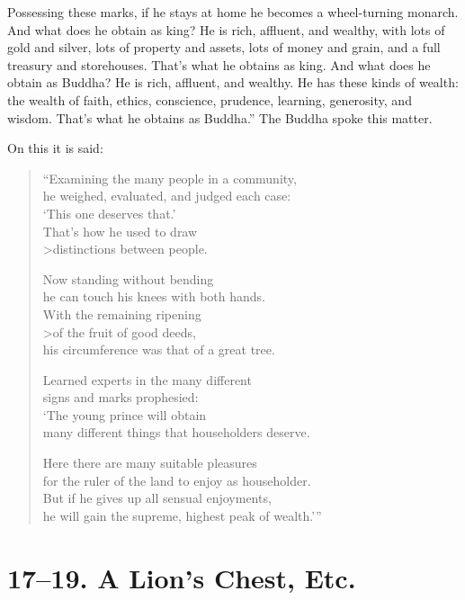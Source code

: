 \documentclass[12pt,openany]{book}%
\begin{document}
Possessing these marks, if he stays at home he becomes a wheel-turning monarch. And what does he obtain as king? He is rich, affluent, and wealthy, with lots of gold and silver, lots of property and assets, lots of money and grain, and a full treasury and storehouses. That’s what he obtains as king. And what does he obtain as Buddha? He is rich, affluent, and wealthy. He has these kinds of wealth: the wealth of faith, ethics, conscience, prudence, learning, generosity, and wisdom. That’s what he obtains as Buddha.” The Buddha spoke this matter. 

On this it is said: 

\begin{verse}%
“Examining the many people in a community, \\
he weighed, evaluated, and judged each case: \\
‘This one deserves that.’ \\
That’s how he used to draw \\>distinctions between people. 

Now standing without bending \\
he can touch his knees with both hands. \\
With the remaining ripening \\>of the fruit of good deeds, \\
his circumference was that of a great tree. 

Learned experts in the many different \\
signs and marks prophesied: \\
‘The young prince will obtain \\
many different things that householders deserve. 

Here there are many suitable pleasures \\
for the ruler of the land to enjoy as householder. \\
But if he gives up all sensual enjoyments, \\
he will gain the supreme, highest peak of wealth.’” 

%
\end{verse}

\section*{17–19. A Lion’s Chest, Etc. }
\end{document}
